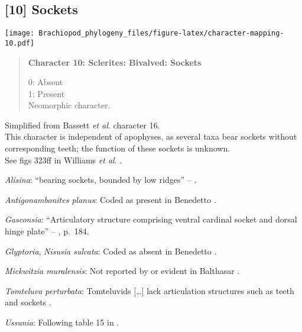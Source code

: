 \documentclass[openany]{book}
\theoremstyle{definition}
\theoremstyle{definition}
\theoremstyle{definition}
\theoremstyle{remark}
\begin{document}
\subsection*{{[}10{]} Sockets}\label{sockets}

\texttt{[image: Brachiopod\_phylogeny\_files/figure-latex/character-mapping-10.pdf]}

\begin{quote}
\textbf{Character 10: Sclerites: Bivalved: Sockets}

0: Absent\\
1: Present\\
Neomorphic character.
\end{quote}

Simplified from Bassett \emph{et al}.
\citeyearpar{Bassett2001Functionalmorphology} character 16.\\
This character is independent of apophyses, as several taxa bear sockets
without corresponding teeth; the function of these sockets is unknown.\\
See figs 323ff in Williams \emph{et al}.
\citeyearpar{Williams1997Introduction}.

\hypertarget{Alisina-coding-10}{}
\emph{Alisina}: ``bearing sockets, bounded by low ridges'' --
\citet{Williams2000LinguliformeaCraniiformea}.

\hypertarget{Antigonambonites_planus-coding-10}{}
\emph{Antigonambonites planus}: Coded as present in Benedetto
\citeyearpar{Benedetto2009iChaniella}.

\hypertarget{Gasconsia-coding-10}{}
\emph{Gasconsia}: ``Articulatory structure comprising ventral cardinal
socket and dorsal hinge plate'' --
\citet{Williams2000LinguliformeaCraniiformea}, p.~184.

\hypertarget{Glyptoria-coding-10}{}
\emph{Glyptoria}, \emph{Nisusia sulcata}: Coded as absent in Benedetto
\citeyearpar{Benedetto2009iChaniella}.

\hypertarget{Mickwitzia_muralensis-coding-10}{}
\emph{Mickwitzia muralensis}: Not reported by or evident in Balthasar
\citeyearpar{Balthasar2004Shellstructure}.

\hypertarget{Tomteluva_perturbata-coding-10}{}
\emph{Tomteluva perturbata}: Tomteluvids {[}\ldots{}{]} lack
articulation structures such as teeth and sockets
\citep{Streng2016Anew}.

\hypertarget{Ussunia-coding-10}{}
\emph{Ussunia}: Following table 15 in
\citet{Williams2000LinguliformeaCraniiformea}.
\end{document}
